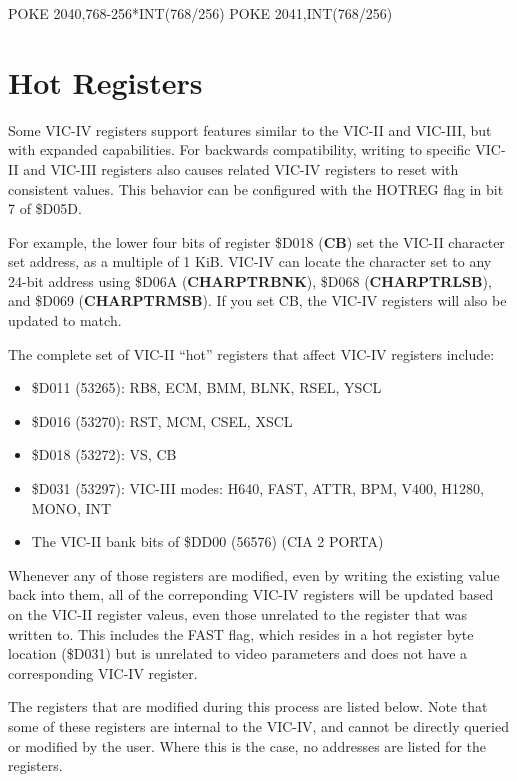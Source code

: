 \begin{screenoutput}
POKE 2040,768-256*INT(768/256)
POKE 2041,INT(768/256)
\end{screenoutput}

\section{Hot Registers}

Some VIC-IV registers support features similar to the VIC-II and VIC-III, but with expanded capabilities. For backwards compatibility, writing to specific VIC-II and VIC-III registers also causes related VIC-IV registers to reset with consistent values. This behavior can be configured with the HOTREG flag in bit 7 of \$D05D.

For example, the lower four bits of register \$D018 (\textbf{CB}) set the VIC-II character set address, as a multiple of 1 KiB. VIC-IV can locate the character set to any 24-bit address using \$D06A (\textbf{CHARPTRBNK}), \$D068 (\textbf{CHARPTRLSB}), and \$D069 (\textbf{CHARPTRMSB}). If you set CB, the VIC-IV registers will also be updated to match.

The complete set of VIC-II ``hot'' registers that affect VIC-IV registers include:

\begin{itemize}
\item \$D011 (53265): RB8, ECM, BMM, BLNK, RSEL, YSCL
\item \$D016 (53270): RST, MCM, CSEL, XSCL
\item \$D018 (53272): VS, CB
\item \$D031 (53297): VIC-III modes: H640, FAST, ATTR, BPM, V400, H1280, MONO, INT
\item The VIC-II bank bits of \$DD00 (56576) (CIA 2 PORTA)
\end{itemize}

Whenever any of those registers are modified, even by writing the existing value back into them, all of the correponding VIC-IV registers will be updated based on the VIC-II register valeus, even those unrelated to the register that was written to. This includes the FAST flag, which resides in a hot register byte location (\$D031) but is unrelated to video parameters and does not have a corresponding VIC-IV register.

The registers that are modified during this process are listed below. Note that some of these registers are internal to the VIC-IV, and cannot be directly queried or modified by the user. Where this is the case, no addresses are listed for the registers.

